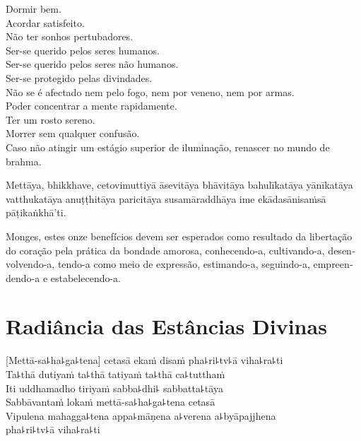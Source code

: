\clearpage

\begin{english}
  Dormir bem.\\
  Acordar satisfeito.\\
  Não ter sonhos pertubadores.\\
  Ser-se querido pelos seres humanos.\\
  Ser-se querido pelos seres não humanos.\\
  Ser-se protegido pelas divindades.\\
  Não se é afectado nem pelo fogo, nem por veneno, nem por armas.\\
  Poder concentrar a mente rapidamente.\\
  Ter um rosto sereno.\\
  Morrer sem qualquer confusão.\\
  Caso não atingir um estágio superior de iluminação, renascer no mundo de brahma.
\end{english}

Mettāya, bhikkhave, cetovimuttiyā āsevitāya bhāvitāya bahulīkatāya yānīkatāya vatthukatāya anuṭṭhitāya paricitāya susamāraddhāya ime ekādasānisaṁsā pāṭikaṅkhā'ti.

\begin{english}
  Monges, estes onze benefícios devem ser esperados como resultado da libertação do coração pela prática da bondade amorosa, conhecendo-a, cultivando-a, desenvolvendo-a, tendo-a como meio de expressão, estimando-a, seguindo-a, empreendendo-a e estabelecendo-a.
\end{english}

\chapter*[Radiância das Estâncias Divinas]{Radiância das Estâncias Divinas}

\delegateSetUseNext


\begin{leader}
\end{leader}

[Mettā-sa꜕ha꜕ga꜕tena] cetasā ekaṁ disaṁ pha꜕ri꜕tv꜕ā viha꜕ra꜕ti\\
Ta꜕thā dutiyaṁ ta꜕thā tatiyaṁ ta꜕thā ca꜕tutthaṁ\\
Iti uddhamadho tiriyaṁ sabba꜕dhi꜕ sabbatta꜕tāya\\
Sabbāvantaṁ lokaṁ mettā-sa꜕ha꜕ga꜕tena cetasā\\
Vipulena mahagga꜕tena appa꜕māṇena a꜕verena a꜕byāpajjhena\\
\vin pha꜕ri꜕tv꜕ā viha꜕ra꜕ti

